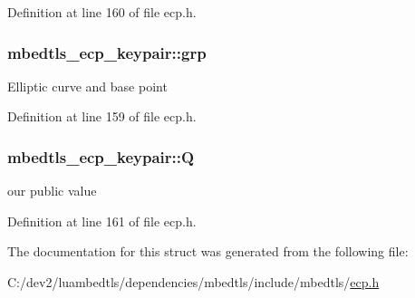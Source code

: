 Definition at line 160 of file ecp.\-h.

\hypertarget{structmbedtls__ecp__keypair_ab5b77c1c63b7396b6869545b121d8828}{
\subsubsection[{grp}]{ mbedtls\-\_\-ecp\-\_\-keypair\-::grp}}\label{structmbedtls__ecp__keypair_ab5b77c1c63b7396b6869545b121d8828}
Elliptic curve and base point 

Definition at line 159 of file ecp.\-h.

\hypertarget{structmbedtls__ecp__keypair_a30cb41708701bb9ed9bdba5972a2ccea}{
\subsubsection[{Q}]{ mbedtls\-\_\-ecp\-\_\-keypair\-::\-Q}}\label{structmbedtls__ecp__keypair_a30cb41708701bb9ed9bdba5972a2ccea}
our public value 

Definition at line 161 of file ecp.\-h.



The documentation for this struct was generated from the following file\-:\begin{DoxyCompactItemize}
\item 
C\-:/dev2/luambedtls/dependencies/mbedtls/include/mbedtls/\hyperlink{ecp_8h}{ecp.\-h}\end{DoxyCompactItemize}
